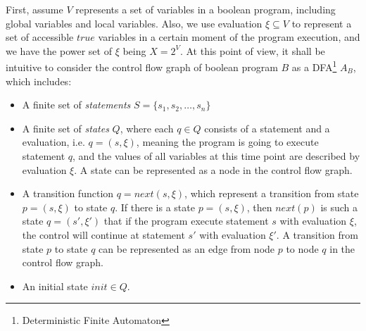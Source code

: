 \documentclass[10pt,journal,final,]{article}
\theoremstyle{definition}
\begin{document}
First, assume $V$ represents a set of variables in a boolean program, including global variables and local variables.
Also, we use evaluation $\xi\subseteq V$ to represent a set of accessible $true$ variables in a certain moment of the program execution, and we have the power set of $\xi$ being $X = 2^{V}$.
At this point of view, it shall be intuitive to consider the control flow graph of boolean program $B$ as a DFA\footnote{Deterministic Finite Automaton} $A_{B}$, which includes:
\begin{itemize}
\item A finite set of {\it statements} $S=\{s_{1},s_{2},\dots,s_{n}\}$
\item A finite set of {\it states} $Q$, where each $q \in Q$ consists of a statement and a evaluation, i.e. $q=(s,\xi)$, meaning the program is going to execute statement $q$, and the values of all variables at this time point are described by evaluation $\xi$. A state can be represented as a node in the control flow graph.
\item A transition function $q=next(s,\xi)$, which represent a transition from state $p=(s,\xi)$ to state $q$. If there is a state $p=(s,\xi)$, then $next(p)$ is such a state $q=(s\prime,\xi\prime)$ that if the program execute statement $s$ with evaluation $\xi$, the control will continue at statement $s\prime$ with evaluation $\xi\prime$. A transition from state $p$ to state $q$ can be represented as an edge from node $p$ to node $q$ in the control flow graph.
\item An initial state $init \in Q$.
\end{itemize}
\end{document}
